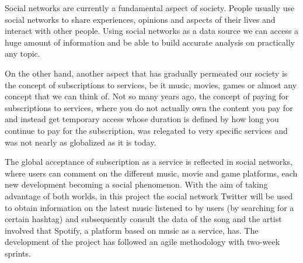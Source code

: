 

\nonzeroparskip Social networks are currently a fundamental aspect of society. People usually use social networks to share experiences, opinions and aspects of their lives and interact with other people. Using social networks as a data source we can access a huge amount of information and be able to build accurate analysis on practically any topic.

\nonzeroparskip On the other hand, another aspect that has gradually permeated our society is the concept of subscriptions to services, be it music, movies, games or almost any concept that we can think of. Not so many years ago, the concept of paying for subscriptions to services, where you do not actually own the content you pay for and instead get temporary access whose duration is defined by how long you continue to pay for the subscription, was relegated to very specific services and was not nearly as globalized as it is today.

\nonzeroparskip The global acceptance of subscription as a service is reflected in social networks, where users can comment on the different music, movie and game platforms, each new development becoming a social phenomenon. With the aim of taking advantage of both worlds, in this project the social network Twitter will be used to obtain information on the latest music listened to by users (by searching for a certain hashtag) and subsequently consult the data of the song and the artist involved that Spotify, a platform based on music as a service, has. The development of the project has followed an agile methodology with two-week sprints.

